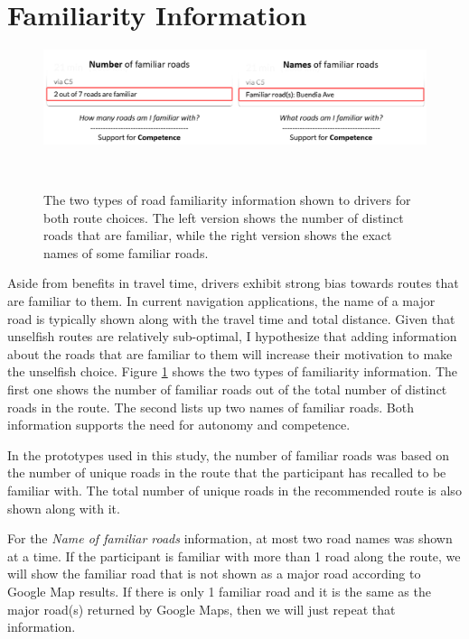 \section{Familiarity Information}

\begin{figure}[h]
\centering
  \includegraphics[scale=0.6]{figures/s3-familiarity.png}
  \caption{The two types of road familiarity information shown to drivers for both route choices. The left version shows the number of distinct roads that are familiar, while the right version shows the exact names of some familiar roads.}~\label{fig:s3-familiarity}
\end{figure}

Aside from benefits in travel time, drivers exhibit strong bias towards routes that are familiar to them\cite{Samson:2019:EFI:3290605.3300601,Patel2006PersonalizingRoutes}. In current navigation applications, the name of a major road is typically shown along with the travel time and total distance. Given that unselfish routes are relatively sub-optimal, I hypothesize that adding information about the roads that are familiar to them will increase their motivation to make the unselfish choice. Figure \ref{fig:s3-familiarity} shows the two types of familiarity information. The first one shows the number of familiar roads out of the total number of distinct roads in the route. The second lists up two names of familiar roads. Both information supports the need for autonomy and competence. 

In the prototypes used in this study, the number of familiar roads was based on the number of unique roads in the route that the participant has recalled to be familiar with. The total number of unique roads in the recommended route is also shown along with it. 

For the \textit{Name of familiar roads} information, at most two road names was shown at a time. If the participant is familiar with more than 1 road along the route, we will show the familiar road that is not shown as a major road according to Google Map results. If there is only 1 familiar road and it is the same as the major road(s) returned by Google Maps, then we will just repeat that information.

